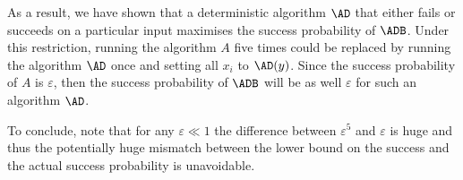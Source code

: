 \documentclass{crypto-exercise}
\begin{document}
As a result, we have shown that a deterministic algorithm $\AD$ that either fails or succeeds on a particular input maximises the success probability of $\ADB$. Under this restriction, running the algorithm $A$ five times could be replaced by running the algorithm $\AD$ once and setting all $x_i$ to $\AD(y)$. Since the success probability of $A$ is $\varepsilon$, then the success probability of $\ADB$ will be as well $\varepsilon$ for such an algorithm $\AD$. 

To conclude, note that for any $\varepsilon \ll 1$ the difference between $\varepsilon^5$ and $\varepsilon$ is huge and thus the potentially huge mismatch between the lower bound on the success and the actual success probability is unavoidable. 
\end{document}
